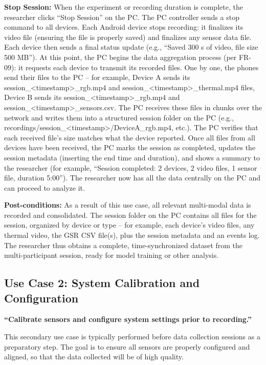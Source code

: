 \textbf{Stop Session:} When the experiment or recording duration is complete, the researcher clicks ``Stop Session'' on the PC. The PC controller sends a stop command to all devices. Each Android device stops recording: it finalizes its video file (ensuring the file is properly saved) and finalizes any sensor data file. Each device then sends a final status update (e.g., ``Saved 300 s of video, file size 500 MB''). At this point, the PC begins the data aggregation process (per FR-09): it requests each device to transmit its recorded files. One by one, the phones send their files to the PC -- for example, Device A sends its session\_\textless timestamp\textgreater\_rgb.mp4 and session\_\textless timestamp\textgreater\_thermal.mp4 files, Device B sends its session\_\textless timestamp\textgreater\_rgb.mp4 and session\_\textless timestamp\textgreater\_sensors.csv. The PC receives these files in chunks over the network and writes them into a structured session folder on the PC (e.g., recordings/session\_\textless timestamp\textgreater/DeviceA\_rgb.mp4, etc.). The PC verifies that each received file's size matches what the device reported. Once all files from all devices have been received, the PC marks the session as completed, updates the session metadata (inserting the end time and duration), and shows a summary to the researcher (for example, ``Session completed: 2 devices, 2 video files, 1 sensor file, duration 5:00''). The researcher now has all the data centrally on the PC and can proceed to analyze it.

\textbf{Post-conditions:} As a result of this use case, all relevant multi-modal data is recorded and consolidated. The session folder on the PC contains all files for the session, organized by device or type -- for example, each device's video files, any thermal video, the GSR CSV file(s), plus the session metadata and an events log. The researcher thus obtains a complete, time-synchronized dataset from the multi-participant session, ready for model training or other analysis.

\subsection{Use Case 2: System Calibration and Configuration}

\textbf{``Calibrate sensors and configure system settings prior to recording.''}

This secondary use case is typically performed before data collection sessions as a preparatory step. The goal is to ensure all sensors are properly configured and aligned, so that the data collected will be of high quality.


